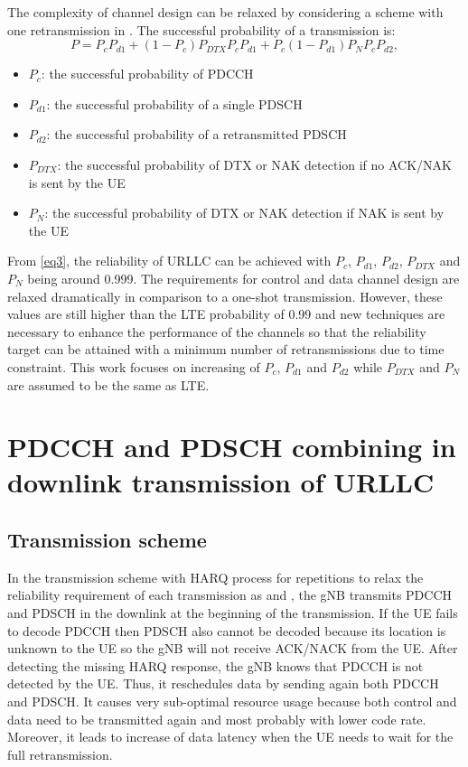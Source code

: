 \documentclass[conference,10pt]{IEEEtran}
\begin{document}
The complexity of channel design can be relaxed by considering a scheme with one retransmission in \cite{b7}. The successful probability of a transmission is:
\begin{equation}
P = P_{c}P_{d1} + (1-P_{c})P_{DTX}P_{c}P_{d1} + P_{c}(1-P_{d1})P_{N}P_{c}P_{d2},\label{eq3}
\end{equation}
\begin{itemize}
    \item $P_{c}$: the successful probability of PDCCH
    \item $P_{d1}$: the successful probability of a single PDSCH
    \item $P_{d2}$: the successful probability of a retransmitted PDSCH
    \item $P_{DTX}$: the successful probability of DTX or NAK detection if no ACK/NAK is sent by the UE
    \item $P_{N}$: the successful probability of DTX or NAK detection if NAK is sent by the UE
\end{itemize}

From \eqref{eq3}, the reliability of URLLC can be achieved with $P_{c}$, $P_{d1}$, $P_{d2}$, $P_{DTX}$ and $P_{N}$ being around 0.999. The requirements for control and data channel design are relaxed dramatically in comparison to a one-shot transmission. However, these values are still higher than the LTE probability of 0.99 and new techniques are necessary to enhance the performance of the channels so that the reliability target can be attained with a minimum number of retransmissions due to time constraint. This work focuses on increasing of $P_{c}$, $P_{d1}$ and $P_{d2}$ while $P_{DTX}$ and $P_{N}$ are assumed to be the same as LTE.

\section{PDCCH and PDSCH combining in downlink transmission of URLLC}

\subsection{Transmission scheme}\label{AA}
In the transmission scheme with HARQ process for repetitions to relax the reliability requirement of each transmission as \cite{b3} and \cite{b4}, the gNB transmits PDCCH and PDSCH in the downlink at the beginning of the transmission. If the UE fails to decode PDCCH then PDSCH also cannot be decoded because its location is unknown to the UE so the gNB will not receive ACK/NACK from the UE. After detecting the missing HARQ response, the gNB knows that PDCCH is not detected by the UE. Thus, it reschedules data by sending again both PDCCH and PDSCH. It causes very sub-optimal resource usage because both control and data need to be transmitted again and most probably with lower code rate. Moreover, it leads to increase of data latency when the UE needs to wait for the full retransmission.
\end{document}
